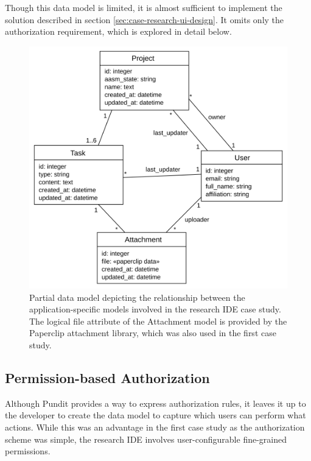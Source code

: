 \documentclass[document.tex]{subfiles}
\begin{document}
Though this data model is limited, it is almost sufficient to implement the solution described in section \ref{sec:case-research-ui-design}. It omits only the authorization requirement, which is explored in detail below.

\begin{figure}[!ht]
\centering \includegraphics[width=5.0in]{./img/case-study-research-railgun/data-model}
\caption{Partial data model depicting the relationship between the application-specific models involved in the research IDE case study. The logical file attribute of the Attachment model is provided by the Paperclip attachment library, which was also used in the first case study.}
\label{fig:case-research-data-model}
\end{figure}


\FloatBarrier

\subsection {Permission-based Authorization}

Although Pundit provides a way to express authorization rules, it leaves it up to the developer to create the data model to capture which users can perform what actions. While this was an advantage in the first case study as the authorization scheme was simple, the research IDE involves user-configurable fine-grained permissions.
\end{document}
